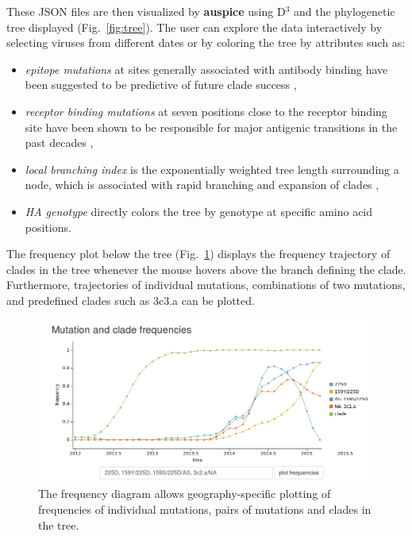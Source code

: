 \documentclass{bioinfo}
\newcommand{\FIG}[1]{Fig.~\ref{fig:#1}}
\newcommand{\auspice}{\textbf{auspice}}
\begin{document}
These JSON files are then visualized by \auspice{} using D$^3$ \citep{bostock_d3_2011} and the phylogenetic tree displayed (\FIG{tree}).
The user can explore the data interactively by selecting viruses from different dates or by coloring the tree by attributes such as:
\begin{itemize}
	\item \textit{epitope mutations} at sites generally associated with antibody binding have been suggested to be predictive of future clade success \citep{luksza_predictive_2014},
    \item \textit{receptor binding mutations} at seven positions close to the receptor binding site have been shown to be responsible for major antigenic transitions in the past decades \citep{koel_substitutions_2013},
    \item \textit{local branching index} is the exponentially weighted tree length surrounding a node, which is associated with rapid branching and expansion of clades \citep{neher_predicting_2014},
    \item \textit{HA genotype} directly colors the tree by genotype at specific amino acid positions.
\end{itemize}

The frequency plot below the tree (\FIG{freq}) displays the frequency trajectory of clades in the tree whenever the mouse hovers above the branch defining the clade. 
Furthermore, trajectories of individual mutations, combinations of two mutations, and predefined clades such as 3c3.a can be plotted.

\begin{figure}[t]
	\centering
	\includegraphics[width=0.99\columnwidth]{figures/frequencies}
	\caption[]{The frequency diagram allows geography-specific plotting of frequencies of individual mutations, pairs of mutations and clades in the tree.}
	\label{fig:freq}
\end{figure}
\end{document}
